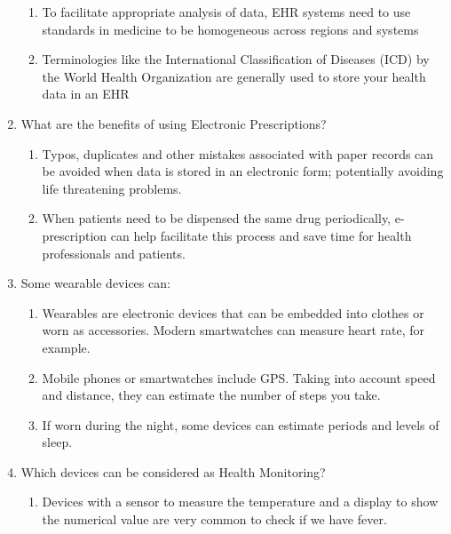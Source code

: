 \documentclass[10pt, twoside]{article}   	%
\begin{document}
\begin{enumerate}
\begin{enumerate}
              \item To facilitate appropriate analysis of data, EHR systems need to use standards in medicine to be homogeneous across regions and systems\
              \item Terminologies like the International Classification of Diseases (ICD) by the World Health Organization are generally used to store your health data in an EHR
           \end {enumerate}       
       \item What are the benefits of using Electronic Prescriptions?
          \begin{enumerate}  
              \item Typos, duplicates and other mistakes associated with paper records can be avoided when data is stored in an electronic form; potentially avoiding life threatening problems.
              \item When patients need to be dispensed the same drug periodically, e-prescription can help facilitate this process and save time for health professionals and patients.
           \end {enumerate}       
       \item Some wearable devices can:
          \begin{enumerate}  
              \item Wearables are electronic devices that can be embedded into clothes or worn as accessories. Modern smartwatches can measure heart rate, for example.
              \item Mobile phones or smartwatches include GPS. Taking into account speed and distance, they can estimate the number of steps you take.
              \item If worn during the night, some devices can estimate periods and levels of sleep.
           \end {enumerate}       
       \item Which devices can be considered as Health Monitoring?
          \begin{enumerate}  
              \item Devices with a sensor to measure the temperature and a display to show the numerical value are very common to check if we have fever.

\end{enumerate}
\end{enumerate}
\end{document}

